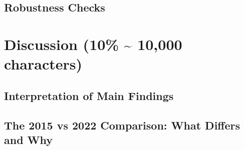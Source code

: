 \documentclass[12pt]{scrartcl}
\numberwithin{equation}{section}				%
\begin{document}
    \subsection{Robustness Checks}
    
    \section{Discussion (10\% \; \textasciitilde{} 10,000 characters)}
    
    \subsection{Interpretation of Main Findings}
    
    \subsection{The 2015 vs 2022 Comparison: What Differs and Why}
    
\end{document}
